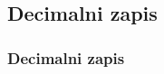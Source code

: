 

        


    \subsection{Decimalni zapis}

        \begin{frame}
            \frametitle{Decimalni zapis}
        \end{frame}

